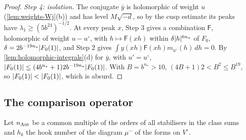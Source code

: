 \begin{proof}
\emph{Step 4: isolation.} The conjugate $\bar y$ is holomorphic of weight $u$ (\cref{lem:weights-Wj}(b)) and has level $M\sqrt{-d}$, so by the cusp estimate its peaks have $\lambda_1\ge(5b^{24})^{-1/2}$. At every peak $x$, Step 3 gives a combination
$\mathsf F$, holomorphic of weight $u-u^\circ$, with $h\mapsto\mathsf F(xh)$ within $\delta\lvert h\rvert^{6n_*}$ of $F_0$, $\delta=2b^{-19n_*}\lvert F_0(1)\rvert$, and Step 2 gives $\int y(xh)\mathsf F(xh)m_{u^\circ}(h)\,dh=0$. By \cref{lem:holomorphic-integrals}(d) for $\bar y$, with $u'=u^\circ$,
$\lvert F_0(1)\rvert\le(4b^{n_*}+1)2b^{-19n_*}\lvert F_0(1)\rvert$. With $B=b^{n_*}>10$, $(4B+1)2<B^2\le B^{19}$, so $\lvert F_0(1)\rvert<\lvert F_0(1)\rvert$, which is absurd.
\end{proof}

\subsection{The comparison operator}\label{ss:comparison-operator}
Let $n_{\rm Aut}$ be a common multiple of the orders of all stabilisers in the class sums and $h_k$ the hook number of the diagram $\mu^-$ of the forms on $V^\circ$.

